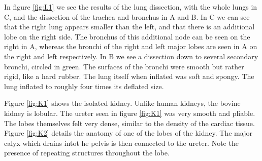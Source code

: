 \documentclass[12pt]{article}
\begin{document}
\par{}
In figure \ref{fig:L1} we see the results of the lung dissection, with the whole lungs in C, and the dissection of the trachea and bronchus in A and B. In C we can see that the right lung appears smaller than the left, and that there is an additional lobe on the right side. The bronchus of this additional node can be seen on the right in A, whereas the bronchi of the right and left major lobes are seen in A on the right and left respectively. In B we see a dissection down to several secondary bronchi, circled in green. The surfaces of the bronchi were smooth but rather rigid, like a hard rubber. The lung itself when inflated was soft and spongy. The lung inflated to roughly four times its deflated size.
\par{}
Figure \ref{fig:K1} shows the isolated kidney. Unlike human kidneys, the bovine kidney is lobular. The ureter seen in figure \ref{fig:K1} was very smooth and pliable. The lobes themselves felt very dense, similar to the density of the cardiac tissue. Figure \ref{fig:K2} details the anatomy of one of the lobes of the kidney. The major calyx which drains intot he pelvis is then connected to the ureter. Note the presence of repeating structures throughout the lobe.
\end{document}
